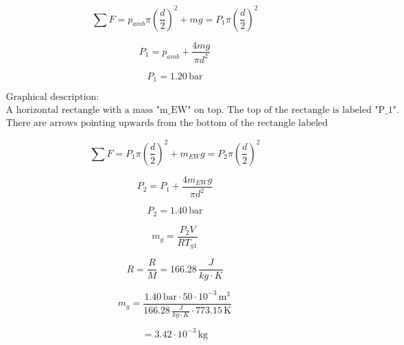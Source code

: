 \begin{equation*}
    \sum F = p_{amb} \pi \left( \frac{d}{2} \right)^2 + mg = P_1 \pi \left( \frac{d}{2} \right)^2
\end{equation*}

\begin{equation*}
    P_1 = p_{amb} + \frac{4mg}{\pi d^2}
\end{equation*}

\begin{equation*}
    P_1 = 1.20 \, \text{bar}
\end{equation*}

\[
\begin{array}{c}
\text{Graphical description:} \\
\text{A horizontal rectangle with a mass "m_{EW}" on top. The top of the rectangle is labeled "P_1".} \\
\text{There are arrows pointing upwards from the bottom of the rectangle labeled "P_2".}
\end{array}
\]

\begin{equation*}
    \sum F = P_1 \pi \left( \frac{d}{2} \right)^2 + m_{EW} g = P_2 \pi \left( \frac{d}{2} \right)^2
\end{equation*}

\begin{equation*}
    P_2 = P_1 + \frac{4 m_{EW} g}{\pi d^2}
\end{equation*}

\begin{equation*}
    P_2 = 1.40 \, \text{bar}
\end{equation*}

\begin{equation*}
    m_g = \frac{P_2 V}{R T_{g1}}
\end{equation*}

\begin{equation*}
    R = \frac{R}{M} = 166.28 \, \frac{J}{kg \cdot K}
\end{equation*}

\begin{equation*}
    m_g = \frac{1.40 \, \text{bar} \cdot 50 \cdot 10^{-3} \, \text{m}^3}{166.28 \, \frac{J}{kg \cdot K} \cdot 773.15 \, \text{K}}
\end{equation*}

\begin{equation*}
    = 3.42 \cdot 10^{-3} \, \text{kg}
\end{equation*}

